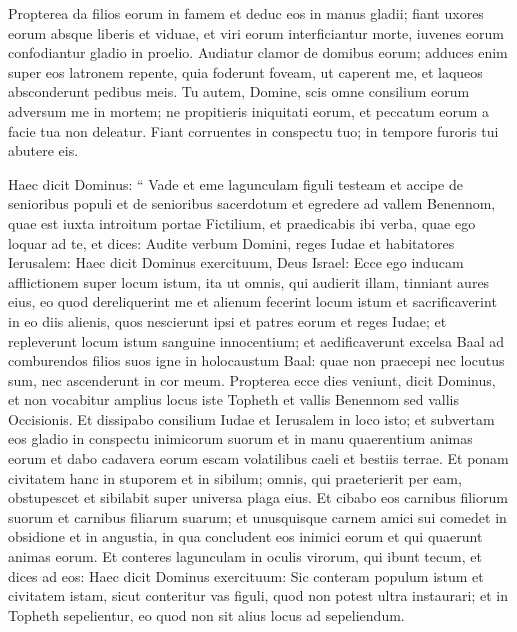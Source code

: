 \begin{biblechapter}
\begin{biblechapter}
\begin{biblechapter}
\begin{biblechapter}
\begin{biblechapter}
\begin{biblechapter}
\begin{biblechapter}
\begin{biblechapter}
\begin{biblechapter}
\begin{biblechapter}
\begin{biblechapter}
\begin{biblechapter}
\begin{biblechapter}
\begin{biblechapter}
\begin{biblechapter}
\begin{biblechapter}
\begin{biblechapter}
\begin{biblechapter}
 \verse Propterea da filios eorum in famem
 et deduc eos in manus gladii;
 fiant uxores eorum absque liberis et viduae,
 et viri eorum interficiantur morte,
 iuvenes eorum confodiantur gladio in proelio.
 \verse Audiatur clamor de domibus eorum;
 adduces enim super eos latronem repente,
 quia foderunt foveam, ut caperent me,
 et laqueos absconderunt pedibus meis.
 \verse Tu autem, Domine, scis omne consilium eorum
 adversum me in mortem;
 ne propitieris iniquitati eorum,
 et peccatum eorum a facie tua non deleatur.
 Fiant corruentes in conspectu tuo;
 in tempore furoris tui abutere eis.
 
\begin{biblechapter}
\verse Haec dicit Dominus: “ Vade et eme lagunculam figuli testeam et accipe de senioribus populi et de senioribus sacerdotum 
\verse et egredere ad vallem Benennom, quae est iuxta introitum portae Fictilium, et praedicabis ibi verba, quae ego loquar ad te, 
\verse et dices: Audite verbum Domini, reges Iudae et habitatores Ierusalem: Haec dicit Dominus exercituum, Deus Israel: Ecce ego inducam afflictionem super locum istum, ita ut omnis, qui audierit illam, tinniant aures eius, 
\verse eo quod dereliquerint me et alienum fecerint locum istum et sacrificaverint in eo diis alienis, quos nescierunt ipsi et patres eorum et reges Iudae; et repleverunt locum istum sanguine innocentium; 
\verse et aedificaverunt excelsa Baal ad comburendos filios suos igne in holocaustum Baal: quae non praecepi nec locutus sum, nec ascenderunt in cor meum. 
\verse Propterea ecce dies veniunt, dicit Dominus, et non vocabitur amplius locus iste Topheth et vallis Benennom sed vallis Occisionis. 
\verse Et dissipabo consilium Iudae et Ierusalem in loco isto; et subvertam eos gladio in conspectu inimicorum suorum et in manu quaerentium animas eorum et dabo cadavera eorum escam volatilibus caeli et bestiis terrae. 
\verse Et ponam civitatem hanc in stuporem et in sibilum; omnis, qui praeterierit per eam, obstupescet et sibilabit super universa plaga eius. 
\verse Et cibabo eos carnibus filiorum suorum et carnibus filiarum suarum; et unusquisque carnem amici sui comedet in obsidione et in angustia, in qua concludent eos inimici eorum et qui quaerunt animas eorum.
 \verse Et conteres lagunculam in oculis virorum, qui ibunt tecum, 
\verse et dices ad eos: Haec dicit Dominus exercituum: Sic conteram populum istum et civitatem istam, sicut conteritur vas figuli, quod non potest ultra instaurari; et in Topheth sepelientur, eo quod non sit alius locus ad sepeliendum. 

\end{biblechapter}
\end{biblechapter}
\end{biblechapter}
\end{biblechapter}
\end{biblechapter}
\end{biblechapter}
\end{biblechapter}
\end{biblechapter}
\end{biblechapter}
\end{biblechapter}
\end{biblechapter}
\end{biblechapter}
\end{biblechapter}
\end{biblechapter}
\end{biblechapter}
\end{biblechapter}
\end{biblechapter}
\end{biblechapter}
\end{biblechapter}
